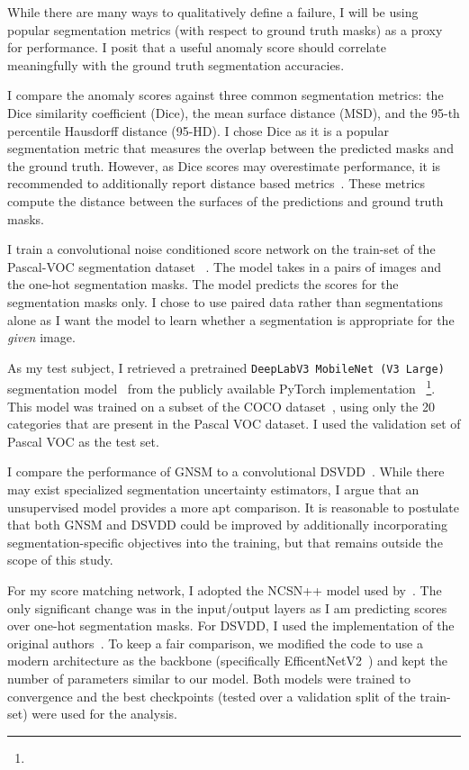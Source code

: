 While there are many ways to qualitatively define a failure, I will be using popular segmentation metrics (with respect to ground truth masks) as a proxy for performance. I posit that a useful anomaly score should correlate meaningfully with the ground truth segmentation accuracies. 

I compare the anomaly scores against three common segmentation metrics: the Dice similarity coefficient (Dice), the mean surface distance (MSD), and the 95-th percentile Hausdorff distance (95-HD). I chose Dice as it is a popular segmentation metric that measures the overlap between the predicted masks and the ground truth. However, as Dice scores may overestimate performance, it is recommended to additionally report distance based metrics~\cite{valentini2014recommendations, taha2015metrics}. These metrics compute the distance between the surfaces of the predictions and ground truth masks.

I train a convolutional noise conditioned score network on the train-set of the Pascal-VOC segmentation dataset ~\cite{Everingham10}. The model takes in a pairs of images and the one-hot segmentation masks. The model predicts the scores for the segmentation masks only. I chose to use paired data rather than segmentations alone as I want the model to learn whether a segmentation is appropriate for the \textit{given} image. 

As my test subject, I retrieved a pretrained \texttt{DeepLabV3 MobileNet (V3 Large)} segmentation model~\cite{chen2017rethinking} from the publicly available PyTorch implementation ~\footnote{\tiny {}}. This model was trained on a subset of the COCO dataset~\cite{cocodataset}, using only the 20 categories that are present in the Pascal VOC dataset. I used the validation set of Pascal VOC as the test set.

I compare the performance of GNSM to a convolutional DSVDD~\cite{pmlr-v80-ruff18a}. While there may exist specialized segmentation uncertainty estimators, I argue that an unsupervised model provides a more apt comparison. It is reasonable to postulate that both GNSM and DSVDD could be improved by additionally incorporating segmentation-specific objectives into the training, but that remains outside the scope of this study. 

For my score matching network, I adopted the NCSN++ model used by~\cite{song2020score}. The only significant change was in the input/output layers as I am predicting scores over one-hot segmentation masks. For DSVDD, I used the implementation of the original authors~\cite{pmlr-v80-ruff18a}. To keep a fair comparison, we modified the code to use a modern architecture as the backbone (specifically EfficentNetV2~\cite{tan2021efficientnetv2}) and kept the number of parameters similar to our model. Both models were trained to convergence and the best checkpoints (tested over a validation split of the train-set) were used for the analysis.

